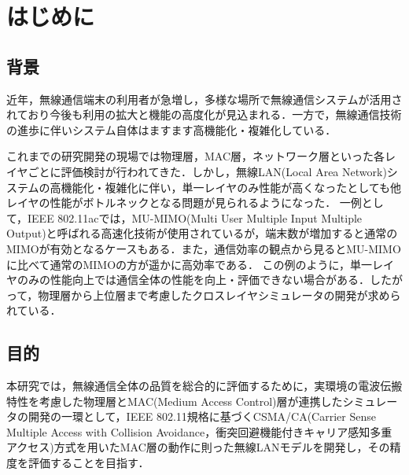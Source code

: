 \documentclass[a4paper,10pt]{ltjsarticle}
\begin{document}
\tableofcontents
\thispagestyle{empty}


\clearpage
\setcounter{page}{1}


\section{はじめに}
\subsection{背景}

近年，無線通信端末の利用者が急増し，多様な場所で無線通信システムが活用されており今後も利用の拡大と機能の高度化が見込まれる．一方で，無線通信技術の進歩に伴いシステム自体はますます高機能化・複雑化している．


これまでの研究開発の現場では物理層，MAC層，ネットワーク層といった各レイヤごとに評価検討が行われてきた．しかし，無線LAN(Local Area Network)システムの高機能化・複雑化に伴い，単一レイヤのみ性能が高くなったとしても他レイヤの性能がボトルネックとなる問題が見られるようになった．
一例として，IEEE 802.11ac\cite{11std}では，MU-MIMO(Multi User Multiple Input Multiple Output)と呼ばれる高速化技術が使用されているが，端末数が増加すると通常のMIMOが有効となるケースもある．また，通信効率の観点から見るとMU-MIMOに比べて通常のMIMOの方が遥かに高効率である\cite{book1}．
この例のように，単一レイヤのみの性能向上では通信全体の性能を向上・評価できない場合がある．したがって，物理層から上位層まで考慮したクロスレイヤシミュレータの開発が求められている．

\subsection{目的}

本研究では，無線通信全体の品質を総合的に評価するために，実環境の電波伝搬特性を考慮した物理層とMAC(Medium Access Control)層が連携したシミュレータの開発の一環として，IEEE 802.11規格\cite{11std}に基づくCSMA/CA(Carrier Sense Multiple Access with Collision Avoidance，衝突回避機能付きキャリア感知多重アクセス)方式を用いたMAC層の動作に則った無線LANモデルを開発し，その精度を評価することを目指す．


\clearpage
\end{document}
